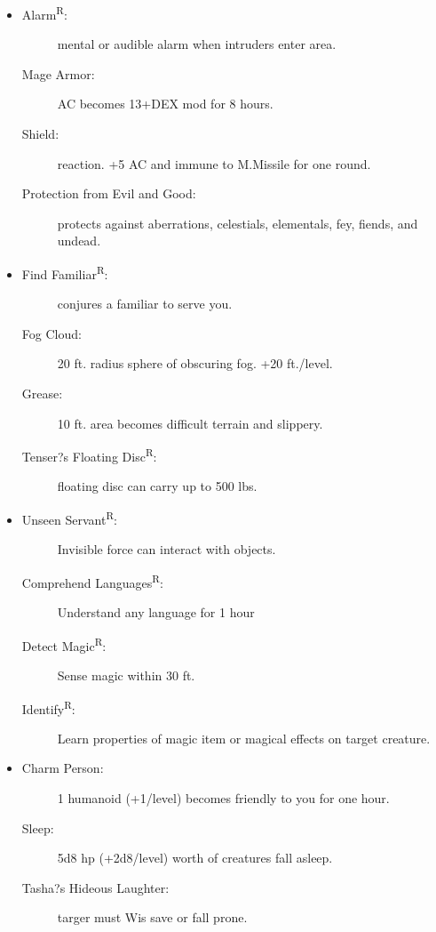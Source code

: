 \documentclass[DIV=14, paper=a4, fontsize=10pt, twocolumn, twoside]{scrartcl}
\begin{document}
\begin{itemize}[align=parleft,labelwidth=1cm]
	\renewcommand{\labelitemi}{Abjur}\item
	\begin{description}
\item[Alarm\textsuperscript{R}:] mental or audible alarm when intruders enter area.
\item[Mage Armor:] AC becomes 13+DEX mod for 8 hours.
\item[Shield:] reaction. +5 AC and immune to M.Missile for one round.
\item[Protection from Evil and Good:] protects against aberrations, celestials, elementals, fey, fiends, and undead.
	\end{description}
	\renewcommand{\labelitemi}{Conj}\item
	\begin{description}
\item[Find Familiar\textsuperscript{R}:] conjures a familiar to serve you.
\item[Fog Cloud:] 20 ft. radius sphere of obscuring fog. +20 ft./level.
\item[Grease:] 10 ft. area becomes difficult terrain and slippery.
\item[Tenser?s Floating Disc\textsuperscript{R}:] floating disc can carry up to 500 lbs.
	\end{description}
	\renewcommand{\labelitemi}{Div}\item
	\begin{description}
\item[Unseen Servant\textsuperscript{R}:] Invisible force can interact with objects.
\item[Comprehend Languages\textsuperscript{R}:] Understand any language for 1 hour
\item[Detect Magic\textsuperscript{R}:] Sense magic within 30 ft.
\item[Identify\textsuperscript{R}:] Learn properties of magic item or magical effects on
target creature.	
	\end{description}
	\renewcommand{\labelitemi}{Ench}\item
	\begin{description}
\item[Charm Person:] 1 humanoid (+1/level) becomes friendly to you
for one hour.
\item[Sleep:] 5d8 hp (+2d8/level) worth of creatures fall asleep.
\item[Tasha?s Hideous Laughter:] targer must Wis save or fall prone.

\end{description}
\end{itemize}
\end{document}
